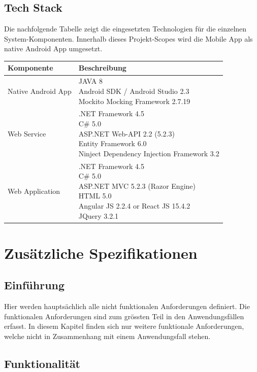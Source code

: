 \documentclass[a4paper,10pt,xetex]{article}
\makeatletter
\newcommand{\specialcell}[2][c]{%
  \begin{tabular}[#1]{@{}l@{}}#2\end{tabular}}
\makeatother
\begin{document}
\subsection{Tech Stack}\label{tech-stack}
Die nachfolgende Tabelle zeigt die eingesetzten Technologien für die
einzelnen System-Komponenten. Innerhalb dieses Projekt-Scopes wird die
Mobile App als native Android App umgesetzt.

\begin{longtabu} to \textwidth { | l | X[l] | }
\hline
\textbf{Komponente} & \textbf{Beschreibung} \\\hline
\endhead

Native Android App & \specialcell{JAVA 8\\Android SDK / Android Studio 2.3\\Mockito Mocking Framework 2.7.19}\\\hline
Web Service & \specialcell{.NET Framework 4.5\\C\# 5.0\\ASP.NET Web-API 2.2 (5.2.3)\\Entity Framework 6.0\\Ninject Dependency Injection Framework 3.2}\\\hline
Web Application & \specialcell{.NET Framework 4.5\\C\# 5.0\\ASP.NET MVC 5.2.3 (Razor Engine)\\HTML 5.0\\Angular JS 2.2.4 or React JS 15.4.2\\JQuery 3.2.1}\\\hline
\end{longtabu}


\section{Zusätzliche Spezifikationen}\label{zusuxe4tzliche-spezifikationen}
\subsection{Einführung}\label{einfuxfchrung}
Hier werden hauptsächlich alle nicht funktionalen Anforderungen
definiert. Die funktionalen Anforderungen sind zum grössten Teil in den
Anwendungsfällen erfasst. In diesem Kapitel finden sich nur weitere
funktionale Anforderungen, welche nicht in Zusammenhang mit einem
Anwendungsfall stehen.


\subsection{Funktionalität}\label{funktionalituxe4t}
\end{document}
